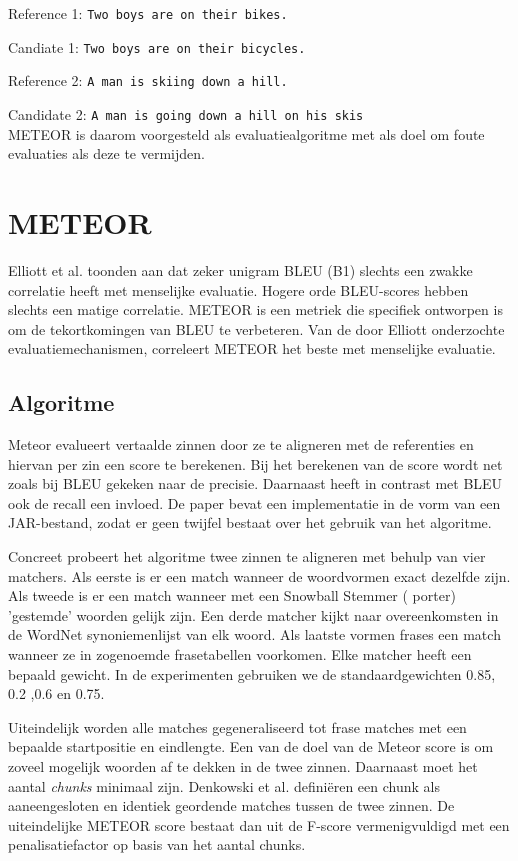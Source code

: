 Reference 1: \texttt{Two boys are on their bikes.}

Candiate 1: \texttt{Two boys are on their bicycles.}

Reference 2: \texttt{A man is skiing down a hill.}

Candidate 2: \texttt{A man is going down a hill on his skis}
\\

METEOR is daarom voorgesteld als evaluatiealgoritme met als doel om foute evaluaties als deze te vermijden.

\section{METEOR}
Elliott et al.  toonden aan dat zeker unigram BLEU (B1) slechts een zwakke correlatie heeft met menselijke evaluatie. Hogere orde BLEU-scores hebben slechts een matige correlatie. METEOR is een metriek die specifiek ontworpen is om de tekortkomingen van BLEU te verbeteren. Van de door Elliott onderzochte evaluatiemechanismen, correleert METEOR het beste met menselijke evaluatie.

\subsection{Algoritme}
Meteor  evalueert vertaalde zinnen door ze te aligneren met de referenties en hiervan per zin een score te berekenen. Bij het berekenen van de score wordt net zoals bij BLEU gekeken naar de precisie. Daarnaast heeft in contrast met BLEU ook de recall een invloed. De paper bevat een implementatie in de vorm van een JAR-bestand, zodat er geen twijfel bestaat over het gebruik van het algoritme.

Concreet probeert het algoritme twee zinnen te aligneren met behulp van vier matchers. Als eerste is er een match wanneer de woordvormen exact dezelfde zijn. Als tweede is er een match wanneer met een Snowball Stemmer ( porter) 'gestemde' woorden gelijk zijn. Een derde matcher kijkt naar overeenkomsten in de WordNet synoniemenlijst van elk woord.  Als laatste vormen frases een match wanneer ze in zogenoemde frasetabellen voorkomen.
Elke matcher heeft een bepaald gewicht. In de experimenten gebruiken we de standaardgewichten 0.85, 0.2 ,0.6 en 0.75.

Uiteindelijk worden alle matches gegeneraliseerd tot frase matches met een bepaalde startpositie en eindlengte. Een van de doel van de Meteor score is om zoveel mogelijk woorden af te dekken in de twee zinnen. Daarnaast moet het aantal \textit{chunks} minimaal zijn. Denkowski et al. defini\"eren een chunk als aaneengesloten en identiek geordende matches tussen de twee zinnen. De uiteindelijke METEOR score bestaat dan uit de F-score vermenigvuldigd met een penalisatiefactor op basis van het aantal chunks.


